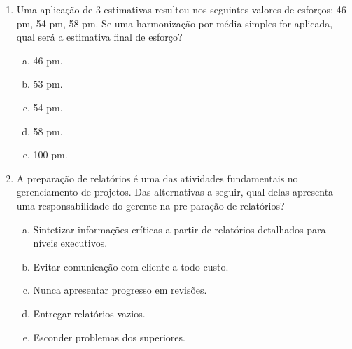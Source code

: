 \documentclass{beamer}
\begin{document}
\begin{frame}
    \begin{enumerate}
        \justifying
        \setcounter{enumi}{16}
        \item<1-2> Uma aplicação de 3 estimativas resultou nos seguintes valores de esforços: 46 pm, 54 pm, 58 pm. Se uma harmonização por média simples for aplicada, qual será a estimativa final de esforço?
        \begin{enumerate}[a)]
            \justifying
            \item<1-2> 46 pm.
            \item<1-2> \alert<2>{53 pm}.
            \item<1-2> 54 pm.
            \item<1-2> 58 pm.
            \item<1-2> 100 pm.
        \end{enumerate}
        \item<3-4> A preparação de relatórios é uma das atividades fundamentais no gerenciamento de projetos. Das alternativas a seguir, qual delas apresenta uma responsabilidade do gerente na pre-paração de relatórios?
        \begin{enumerate}[a)]
            \justifying
            \item<3-4> \alert<4>{Sintetizar informações críticas a partir de relatórios detalhados para níveis executivos}.
            \item<3-4> Evitar comunicação com cliente a todo custo.
            \item<3-4> Nunca apresentar progresso em revisões.
            \item<3-4> Entregar relatórios vazios.
            \item<3-4> Esconder problemas dos superiores.
        \end{enumerate}
    \end{enumerate}
\end{frame}
\end{document}
